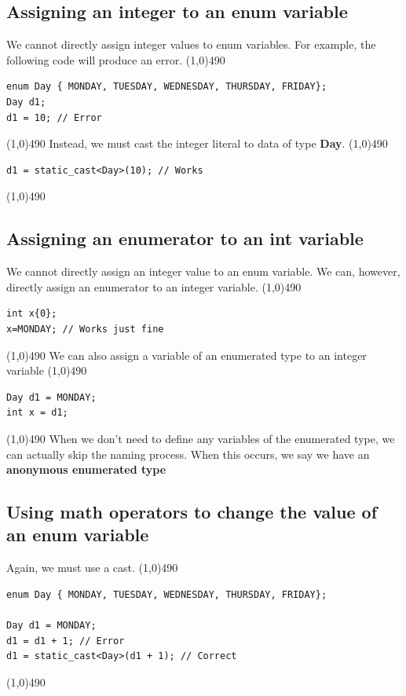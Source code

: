 \documentclass{report}
\begin{document}
    \bigbreak \noindent 
    \subsection{Assigning an integer to an enum variable}
    \bigbreak \noindent 
    We cannot directly assign integer values to enum variables. For example, the following code will produce an error.
    \bigbreak \noindent 
    \line(1,0){490}
    \begin{verbatim}
enum Day { MONDAY, TUESDAY, WEDNESDAY, THURSDAY, FRIDAY};
Day d1;
d1 = 10; // Error
    \end{verbatim}
    \line(1,0){490}
    \bigbreak \noindent 
    Instead, we must cast the integer literal to data of type \textbf{Day}. 
    \bigbreak \noindent 
    \line(1,0){490}
    \begin{verbatim}
d1 = static_cast<Day>(10); // Works
    \end{verbatim}
    \line(1,0){490}

    \pagebreak  \bigbreak \noindent 
    \subsection{Assigning an enumerator to an int variable}
    \bigbreak \noindent 
    We cannot directly assign an integer value to an enum variable. We can, however, directly assign an enumerator to an integer variable.
    \bigbreak \noindent 
    \line(1,0){490}
    \begin{verbatim}
int x{0};
x=MONDAY; // Works just fine
    \end{verbatim}
    \line(1,0){490}
    \bigbreak \noindent 
    We can also assign a variable of an enumerated type to an integer variable
    \bigbreak \noindent 
    \line(1,0){490}
    \begin{verbatim}
Day d1 = MONDAY;
int x = d1;
    \end{verbatim}
    \line(1,0){490}
    \bigbreak \noindent 
    When we don't need to define any variables of the enumerated type, we can actually skip the naming process. When this occurs, we say we have an \textbf{anonymous enumerated type}
    \bigbreak \noindent 
    \subsection{Using math operators to change the value of an enum variable}
    \bigbreak \noindent 
    Again, we must use a cast.
    \bigbreak \noindent 
    \line(1,0){490}
    \begin{verbatim}
enum Day { MONDAY, TUESDAY, WEDNESDAY, THURSDAY, FRIDAY};

Day d1 = MONDAY;
d1 = d1 + 1; // Error
d1 = static_cast<Day>(d1 + 1); // Correct
    \end{verbatim}
    \line(1,0){490}
\end{document}
